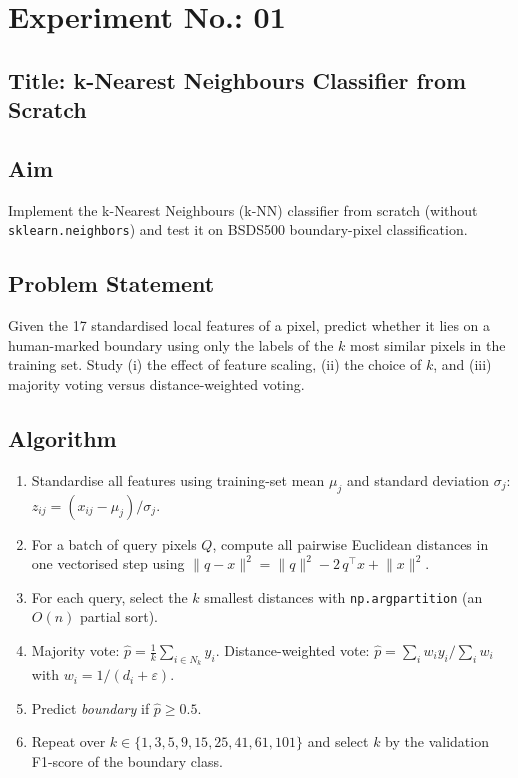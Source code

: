 \documentclass[11pt,a4paper]{article}
\newcommand{\labsection}[1]{\subsection*{#1}}
\begin{document}
\newpage
\section*{Experiment No.: 01}
\labsection{Title: k-Nearest Neighbours Classifier from Scratch}

\labsection{Aim}
Implement the k-Nearest Neighbours (k-NN) classifier from scratch (without \texttt{sklearn.neighbors}) and test it on BSDS500 boundary-pixel classification.

\labsection{Problem Statement}
Given the 17 standardised local features of a pixel, predict whether it lies on a human-marked boundary using only the labels of the $k$ most similar pixels in the training set. Study (i) the effect of feature scaling, (ii) the choice of $k$, and (iii) majority voting versus distance-weighted voting.

\labsection{Algorithm}
\begin{enumerate}[nosep]
  \item Standardise all features using training-set mean $\mu_j$ and standard deviation $\sigma_j$: $z_{ij}=(x_{ij}-\mu_j)/\sigma_j$.
  \item For a batch of query pixels $Q$, compute all pairwise Euclidean distances in one vectorised step using $\lVert q-x\rVert^2 = \lVert q\rVert^2 - 2\,q^\top x + \lVert x\rVert^2$.
  \item For each query, select the $k$ smallest distances with \texttt{np.argpartition} (an $O(n)$ partial sort).
  \item Majority vote: $\hat p = \frac{1}{k}\sum_{i\in N_k} y_i$. Distance-weighted vote: $\hat p = \sum_i w_i y_i / \sum_i w_i$ with $w_i = 1/(d_i+\varepsilon)$.
  \item Predict \emph{boundary} if $\hat p \ge 0.5$.
  \item Repeat over $k\in\{1,3,5,9,15,25,41,61,101\}$ and select $k$ by the validation F1-score of the boundary class.
\end{enumerate}
\end{document}
